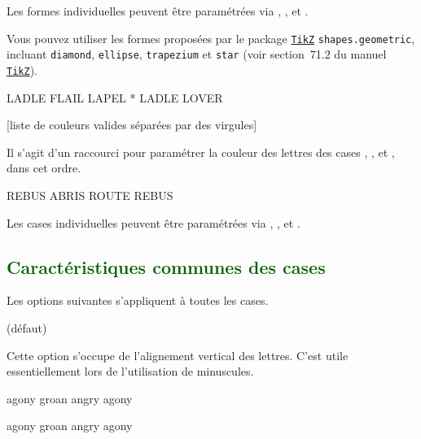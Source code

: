 \documentclass[svgnames]{report}
\newcommand\ctan[1]{\href{https://www.ctan.org/pkg/#1}{\texttt{#1}}}
\newcommand\Section[1]{\subsection{\textcolor{DarkGreen}{#1}}}
\begin{document}
  Les formes individuelles peuvent être paramétrées via , ,
   et .

  Vous pouvez utiliser les formes proposées par le package \ctan{TikZ}
  \texttt{shapes.geometric}, incluant \texttt{diamond},
  \texttt{ellipse}, \texttt{trapezium} et \texttt{star} (voir section~71.2 du manuel \ctan{TikZ}).

  \begin{example}
  \begin{GrilleSutom}[Formes={diamond,ellipse,star}]{LADLE}
     FLAIL
     LAPEL
     *
     LADLE
     LOVER
  \end{GrilleSutom}
  \end{example}

  [liste de couleurs valides séparées par des virgules]

  Il s'agit d'un raccourci pour paramétrer la couleur des lettres des cases , ,  et , dans cet ordre.

  \begin{example}
  \begin{GrilleSutom}[CouleurLettres={red,orange,blue}]{REBUS}
    ABRIS
    ROUTE
    REBUS
  \end{GrilleSutom}
  \end{example}

  Les cases individuelles peuvent être paramétrées via , ,  et .


  \Section{Caractéristiques communes des cases}

  Les options suivantes s'appliquent à toutes les cases.

   (défaut) \qquad

  Cette option s'occupe de l'alignement vertical des lettres. C'est utile essentiellement lors de l'utilisation de minuscules.

  \begin{example}
  \begin{GrilleSutom}[align]{agony}
     groan
     angry
     agony
  \end{GrilleSutom}
  \end{example}

  \begin{example}
  \begin{GrilleSutom}{agony} %
    groan
    angry
    agony
  \end{GrilleSutom}
  \end{example}
\end{document}
